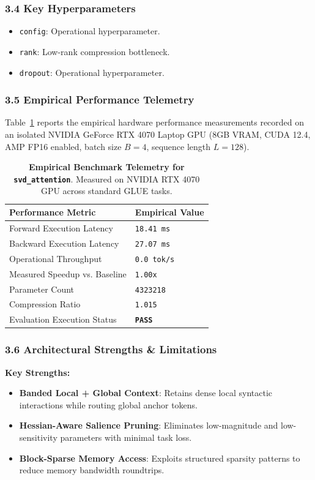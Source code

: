 \subsubsection*{3.4 Key Hyperparameters}
\begin{itemize}
    \item \texttt{config}: Operational hyperparameter.
    \item \texttt{rank}: Low-rank compression bottleneck.
    \item \texttt{dropout}: Operational hyperparameter.
\end{itemize}

\subsubsection*{3.5 Empirical Performance Telemetry}
Table~\ref{tab:telemetry_svd\_attention} reports the empirical hardware performance measurements recorded on an isolated NVIDIA GeForce RTX 4070 Laptop GPU (8GB VRAM, CUDA 12.4, AMP FP16 enabled, batch size $B=4$, sequence length $L=128$).

\begin{table}[h]
\centering
\small
\caption{\textbf{Empirical Benchmark Telemetry for \texttt{svd\_attention}}. Measured on NVIDIA RTX 4070 GPU across standard GLUE tasks.}
\label{tab:telemetry_svd\_attention}
\begin{tabularx}{\columnwidth}{lX}
\toprule
\textbf{Performance Metric} & \textbf{Empirical Value} \\
\midrule
Forward Execution Latency & \texttt{18.41 ms} \\
Backward Execution Latency & \texttt{27.07 ms} \\
Operational Throughput & \texttt{0.0 tok/s} \\
Measured Speedup vs. Baseline & \texttt{1.00x} \\
Parameter Count & \texttt{4323218} \\
Compression Ratio & \texttt{1.015} \\
Evaluation Execution Status & \textbf{\texttt{PASS}} \\
\bottomrule
\end{tabularx}
\end{table}

\subsubsection*{3.6 Architectural Strengths \& Limitations}
\textbf{Key Strengths:}
\begin{itemize}
    \item \textbf{Banded Local + Global Context}: Retains dense local syntactic interactions while routing global anchor tokens.
    \item \textbf{Hessian-Aware Salience Pruning}: Eliminates low-magnitude and low-sensitivity parameters with minimal task loss.
    \item \textbf{Block-Sparse Memory Access}: Exploits structured sparsity patterns to reduce memory bandwidth roundtrips.
\end{itemize}

